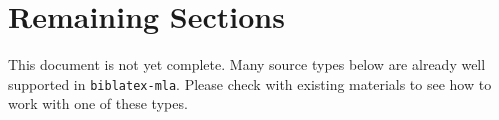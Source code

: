 \documentclass{article}
\begin{document}
%
%
%
%
%
%
%
%

\section*{Remaining Sections} %
\label{sec:remaining_sections}

This document is not yet complete. Many source types below are already well supported in \texttt{biblatex-mla}. Please check with existing materials to see how to work with one of these types.
\end{document}
